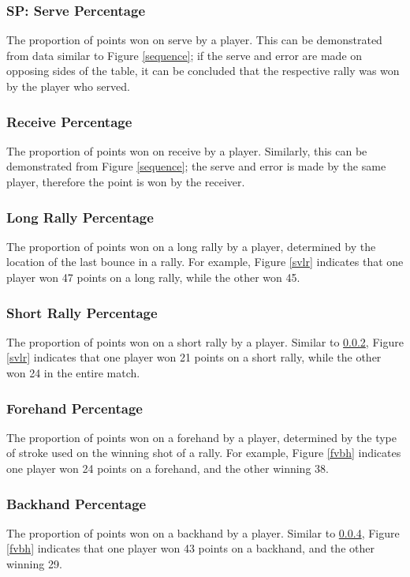 \subsubsection*{SP: Serve Percentage}\label{sp}
The proportion of points won on serve by a player. This can be demonstrated from data similar to Figure \ref{sequence}; if the serve and error are made on opposing sides of the table, it can be concluded that the respective rally was won by the player who served.

\subsubsection{Receive Percentage}\label{rp}
The proportion of points won on receive by a player. Similarly, this can be demonstrated from Figure \ref{sequence}; the serve and error is made by the same player, therefore the point is won by the receiver.

\subsubsection{Long Rally Percentage}\label{lrp}
The proportion of points won on a long rally by a player, determined by the location of the last bounce in a rally. For example, Figure \ref{svlr} indicates that one player won 47 points on a long rally, while the other won 45.

\subsubsection{Short Rally Percentage}\label{srp}
The proportion of points won on a short rally by a player. Similar to \ref{lrp}, Figure \ref{svlr} indicates that one player won 21 points on a short rally, while the other won 24 in the entire match.

\subsubsection{Forehand Percentage}\label{fp}
The proportion of points won on a forehand by a player, determined by the type of stroke used on the winning shot of a rally. For example, Figure \ref{fvbh} indicates one player won 24 points on a forehand, and the other winning 38.

\subsubsection{Backhand Percentage}\label{bp}
The proportion of points won on a backhand by a player. Similar to \ref{fp}, Figure \ref{fvbh} indicates that one player won 43 points on a backhand, and the other winning 29.

